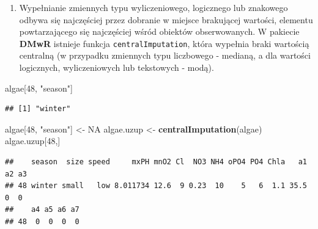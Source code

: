 \documentclass[]{book}
\newenvironment{Shaded}{\begin{snugshade}}{\end{snugshade}}
\newcommand{\DataTypeTok}[1]{\textcolor[rgb]{0.13,0.29,0.53}{#1}}
\newcommand{\DecValTok}[1]{\textcolor[rgb]{0.00,0.00,0.81}{#1}}
\newcommand{\KeywordTok}[1]{\textcolor[rgb]{0.13,0.29,0.53}{\textbf{#1}}}
\newcommand{\NormalTok}[1]{#1}
\newcommand{\OperatorTok}[1]{\textcolor[rgb]{0.81,0.36,0.00}{\textbf{#1}}}
\newcommand{\OtherTok}[1]{\textcolor[rgb]{0.56,0.35,0.01}{#1}}
\newcommand{\StringTok}[1]{\textcolor[rgb]{0.31,0.60,0.02}{#1}}
\providecommand{\tightlist}{%
  \setlength{\itemsep}{0pt}\setlength{\parskip}{0pt}}
\theoremstyle{plain}
\theoremstyle{definition}
\theoremstyle{definition}
\theoremstyle{definition}
\theoremstyle{definition}
\theoremstyle{remark}
\begin{document}
\begin{Shaded}
\end{Shaded}

\begin{enumerate}
\def\labelenumi{\arabic{enumi}.}
\setcounter{enumi}{2}
\tightlist
\item
  Wypełnianie zmiennych typu wyliczeniowego, logicznego lub znakowego odbywa się najczęściej przez dobranie w miejsce brakującej wartości, elementu powtarzającego się najczęściej wśród obiektów obserwowanych. W pakiecie \textbf{DMwR} istnieje funkcja \texttt{centralImputation}, która wypełnia braki wartością centralną (w przypadku zmiennych typu liczbowego - medianą, a dla wartości logicznych, wyliczeniowych lub tekstowych - modą).
\end{enumerate}

\begin{Shaded}
\begin{Highlighting}[]
\NormalTok{algae[}\DecValTok{48}\NormalTok{, }\StringTok{"season"}\NormalTok{]}
\end{Highlighting}
\end{Shaded}

\begin{verbatim}
## [1] "winter"
\end{verbatim}

\begin{Shaded}
\begin{Highlighting}[]
\NormalTok{algae[}\DecValTok{48}\NormalTok{, }\StringTok{"season"}\NormalTok{] <-}\StringTok{ }\OtherTok{NA}
\NormalTok{algae.uzup <-}\StringTok{ }\KeywordTok{centralImputation}\NormalTok{(algae)}
\NormalTok{algae.uzup[}\DecValTok{48}\NormalTok{,]}
\end{Highlighting}
\end{Shaded}

\begin{verbatim}
##    season  size speed     mxPH mnO2 Cl  NO3 NH4 oPO4 PO4 Chla   a1 a2 a3
## 48 winter small   low 8.011734 12.6  9 0.23  10    5   6  1.1 35.5  0  0
##    a4 a5 a6 a7
## 48  0  0  0  0
\end{verbatim}
\end{document}
